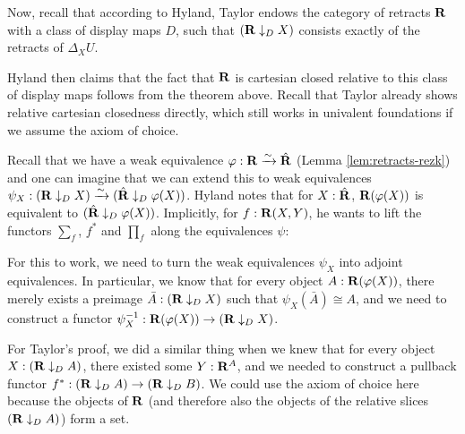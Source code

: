 \begin{remark}
  Now, recall that according to Hyland, Taylor endows the category of retracts $ \mathbf{R} $ with a class of display maps $ D $, such that $ (\mathbf{R} \downarrow_D X) $ consists exactly of the retracts of $ \Delta_X U $.

  Hyland then claims that the fact that $ \mathbf{R} $ is cartesian closed relative to this class of display maps follows from the theorem above. Recall that Taylor already shows relative cartesian closedness directly, which still works in univalent foundations if we assume the axiom of choice.

  Recall that we have a weak equivalence $ \varphi : \mathbf{R} \xrightarrow \sim \hat {\mathbf{R}} $ (Lemma \ref{lem:retracts-rezk}) and one can imagine that we can extend this to weak equivalences $ \psi_X : (\mathbf{R} \downarrow_D X) \xrightarrow \sim (\hat {\mathbf{R}} \downarrow_D \varphi(X)) $. Hyland notes that for $ X : \hat {\mathbf{R}} $, $ \mathbf{R}(\varphi(X)) $ is equivalent to $ (\hat {\mathbf{R}} \downarrow_D \varphi(X)) $. Implicitly, for $ f: \mathbf{R}(X, Y) $, he wants to lift the functors $ \sum_f $, $ f^* $ and $ \prod_f $ along the equivalences $ \psi $:
  \begin{center}
  \end{center}
  For this to work, we need to turn the weak equivalences $ \psi_X $ into adjoint equivalences. In particular, we know that for every object $ A : \mathbf{R}(\varphi(X)) $, there merely exists a preimage $ \bar A : (\mathbf{R} \downarrow_D X) $ such that $ \psi_X(\bar A) \cong A $, and we need to construct a functor $ \psi_X^{-1}: \mathbf{R}(\varphi(X)) \to (\mathbf{R} \downarrow_D X) $.

  For Taylor's proof, we did a similar thing when we knew that for every object $ X : (\mathbf{R} \downarrow_D A) $, there existed some $ Y : \mathbf{R}^A $, and we needed to construct a pullback functor $ f^* : (\mathbf{R} \downarrow_D A) \to (\mathbf{R} \downarrow_D B) $. We could use the axiom of choice here because the objects of $ \mathbf{R} $ (and therefore also the objects of the relative slices $ (\mathbf{R} \downarrow_D A) $) form a set.


\end{remark}
